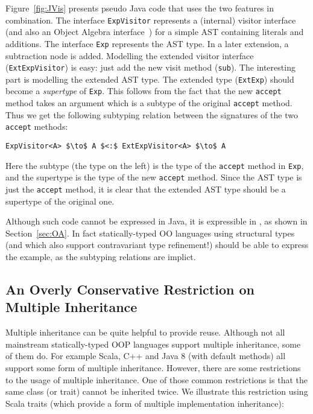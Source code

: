 Figure~\ref{fig:JVis} presents pseudo Java code that uses the two features in
combination. The interface \lstinline{ExpVisitor} represents a (internal)
visitor interface (and also an Object Algebra
interface~\cite{oliveira2012extensibility}) for a simple AST containing literals
and additions. The interface \lstinline{Exp} represents the AST type. In a
later extension, a subtraction node is added. Modelling the extended visitor
interface (\lstinline{ExtExpVisitor}) is easy: just add the new visit method
(\lstinline{sub}). The interesting part is modelling the extended AST type. The
extended type (\lstinline{ExtExp}) should become a \emph{supertype} of
\lstinline{Exp}. This follows from the fact that the new \lstinline{accept}
method takes an argument which is a subtype of the original \lstinline{accept}
method. Thus we get the following subtyping relation between the signatures of
the two \lstinline{accept} methods:

\begin{lstlisting}[mathescape=true]
ExpVisitor<A> $\to$ A $<:$ ExtExpVisitor<A> $\to$ A
\end{lstlisting}

\noindent Here the subtype (the type on the left) is the type of the
\lstinline{accept} method in \lstinline{Exp}, and the supertype is the type of
the new \lstinline{accept} method. Since the AST type is just the
\lstinline{accept} method, it is clear that the extended AST type should be a
supertype of the original one. 

Although such code cannot be expressed in Java, it is expressible in
\name, as shown in Section~\ref{sec:OA}. In fact statically-typed
OO languages using structural types (and which also support
contravariant type refinement!) should be able to express 
the example, as the subtyping relations are implict. 

\subsection{An Overly Conservative Restriction on Multiple Inheritance}

Multiple inheritance can be quite helpful to provide reuse. Although not all
mainstream statically-typed OOP languages support multiple inheritance, some of
them do. For example Scala, C++ and Java 8 (with default methods) all support
some form of multiple inheritance. However, there are some restrictions to the
usage of multiple inheritance. One of those common restrictions is that the same
class (or trait) cannot be inherited twice. We illustrate this restriction using
Scala traits (which provide a form of multiple implementation inheritance):


